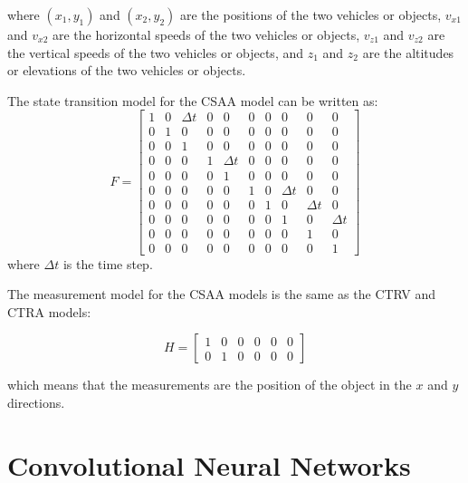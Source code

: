 where $(x_1,y_1)$ and $(x_2,y_2)$ are the positions of the two vehicles or objects, $v_{x1}$ and $v_{x2}$ are the horizontal speeds of the two vehicles or objects, $v_{z1}$ and $v_{z2}$ are the vertical speeds of the two vehicles or objects, and $z_1$ and $z_2$ are the altitudes or elevations of the two vehicles or objects.

The state transition model for the CSAA model can be written as:
\begin{equation}
	F = \begin{bmatrix}
		1 & 0 & \Delta t & 0 & 0 & 0 & 0 & 0 & 0 & 0 \\ 
		0 & 1 & 0 & 0 & 0 & 0 & 0 & 0 & 0 & 0 \\ 
		0 & 0 & 1 & 0 & 0 & 0 & 0 & 0 & 0 & 0 \\ 
		0 & 0 & 0 & 1 & \Delta t & 0 & 0 & 0 & 0 & 0 \\ 
		0 & 0 & 0 & 0 & 1 & 0 & 0 & 0 & 0 & 0 \\ 
		0 & 0 & 0 & 0 & 0 & 1 & 0 & \Delta t & 0 & 0 \\ 
		0 & 0 & 0 & 0 & 0 & 0 & 1 & 0 & \Delta t & 0 \\ 
		0 & 0 & 0 & 0 & 0 & 0 & 0 & 1 & 0 & \Delta t \\ 
		0 & 0 & 0 & 0 & 0 & 0 & 0 & 0 & 1 & 0 \\ 
		0 & 0 & 0 & 0 & 0 & 0 & 0 & 0 & 0 & 1
	\end{bmatrix}
\end{equation}
where $\Delta t$ is the time step.

The measurement model for the CSAA models is the same as the CTRV and CTRA models:

\begin{equation}
	H = \begin{bmatrix}
		1 & 0 & 0 & 0 & 0 & 0 \\ 
		0 & 1 & 0 & 0 & 0 & 0
	\end{bmatrix}
\end{equation}

which means that the measurements are the position of the object in the $x$ and $y$ directions.

\section{Convolutional Neural Networks}
\label{sec:3_cnns}



